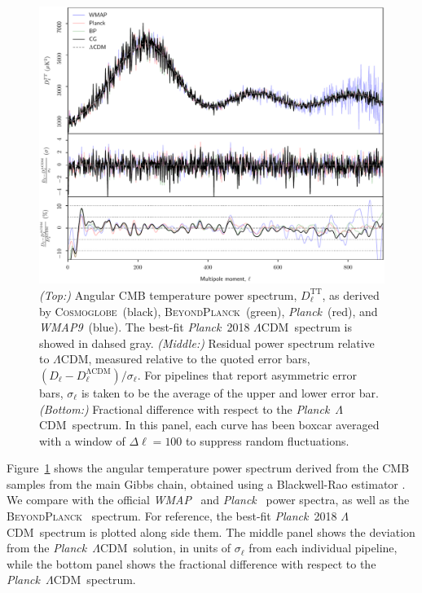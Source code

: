 \documentclass[twocolumn]{../../common/aa}
\def\WMAP{\emph{WMAP}}
\def\WMAPnine{\emph{WMAP9}}
\def\planck{\emph{Planck}}
\def\LCDM{$\Lambda$CDM}
\newcommand{\bp}{\textsc{BeyondPlanck}}
\newcommand{\cosmoglobe}{\textsc{Cosmoglobe}}
\begin{document}
\begin{figure}
	\includegraphics[width=\textwidth]{figures/cl_TT_CG_v1.pdf}
	\caption{\textit{(Top:)} Angular CMB temperature power spectrum, $D_\ell^\mathrm{TT}$, as derived by \cosmoglobe\ (black), \bp\ (green), \planck\ (red), and \WMAPnine\ (blue). The best-fit \planck\ 2018 \LCDM\ spectrum is showed in dahsed gray. \textit{(Middle:)} Residual power spectrum relative to \LCDM, measured relative to the quoted error bars, $(D_\ell-D_\ell^\mathrm{\Lambda CDM})/\sigma_\ell$. For pipelines that report asymmetric error bars, $\sigma_\ell$ is taken to be the average of the upper and lower error bar. \textit{(Bottom:)} Fractional difference with respect to the \planck\ \LCDM\ spectrum. In this panel, each curve has been boxcar averaged with a window of $\Delta\ell=100$ to suppress random fluctuations.}
	\label{fig:cl_tt}
\end{figure}



Figure~\ref{fig:cl_tt} shows the angular temperature power spectrum derived from the CMB samples from the main Gibbs chain, obtained using a Blackwell-Rao estimator \citep{chu2005,bp11}. We compare with the official \WMAP\ \citep{hinshaw2012} and \planck\ \citep{planck2016-l05} power spectra, as well as the \bp\ \citep{bp11} spectrum. For reference, the best-fit \planck\ 2018 \LCDM\ spectrum is plotted along side them. The middle panel shows the deviation from the \planck\ \LCDM\ solution, in units of $\sigma_\ell$ from each individual pipeline, while the bottom panel shows the fractional difference with respect to the \planck\ \LCDM\ spectrum.
\end{document}
